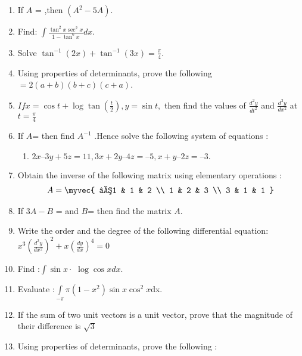 \documentclass{article}
\begin{document}
\begin{enumerate}
\item If $A$ = 
,then  $(A^2-5A)$.
\item Find: $\int\frac{\tan^2x  \sec^2x}{1-\tan^6x} dx$.
\item Solve ${\tan^{-1}(2x)}+{\tan^{-1}(3x)} = \frac{\pi}{4}.$
\item Using properties of determinants, prove the following 
 $ = 2(a + b) (b + c) (c + a)$.
\item $If x = \cos t + \log \tan(\frac{t}{2}),y=\sin t,$ then find the values of $\frac{d^2y}{dt^2}$ and $\frac{d^2y}{dx^2}$ at $t= \frac{\pi}{4}$
\item If $A$=
 then find $A^{-1}$ .Hence solve the    following system of equations :
    \begin{enumerate}
        \item    $2x – 3y + 5z = 11, 3x + 2y – 4z = –5, x + y – 2z = – 3.$
    \end{enumerate}
\item Obtain the inverse of the following matrix using elementary operations :
\begin{align*}
    A=\myvec{
    –1 & 1 & 2  \\
     1 & 2 & 3  \\
     3 & 1 & 1  }
\end{align*}
\item If $3A-B$ =
 and $B$=
  then find the matrix $A$.
\item Write the order and the degree of the following differential equation: $x^3(\frac{d^2y}{dx^2})^2 +x(\frac{dy}{dx})^4 = 0 $
\item Find :$\int \sin x\cdot$ $\log\cos x dx.$
\item Evaluate :$\int\limits_{-\pi}{\pi}(1-x^2)\sin x \cos^2x$dx.
\item If the sum of two unit vectors is a unit vector, prove that the magnitude of their difference is $\sqrt{3}$
\item Using properties of determinants, prove the following :

\end{enumerate}
\end{document}
